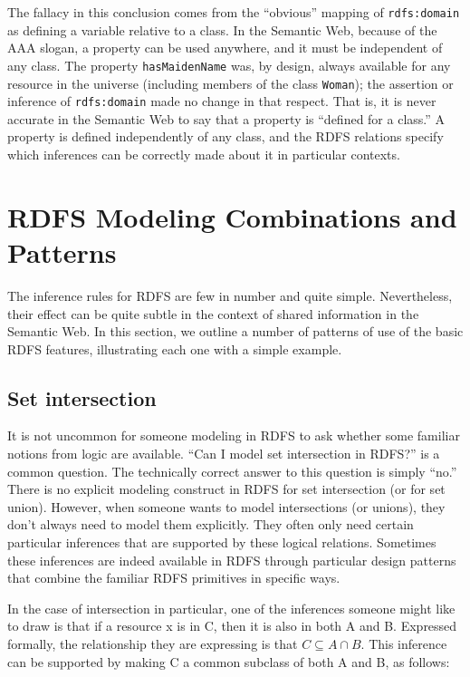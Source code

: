 \begin{sidebar}{}
The fallacy in this conclusion comes from the ``obvious'' mapping of
\texttt{rdfs:domain} as defining a variable relative to a class. In the Semantic
Web, because of the AAA slogan, a property can be used anywhere, and it
must be independent of any class. The property \texttt{hasMaidenName} was, by
design, always available for any resource in the universe (including
members of the class \texttt{Woman}); the assertion or inference of \texttt{rdfs:domain}
made no change in that respect. That is, it is never accurate in the
Semantic Web to say that a property is ``defined for a class.'' A
property is defined independently of any class, and the RDFS relations
specify which inferences can be correctly made about it in particular
contexts.

\end{sidebar}

\section{RDFS Modeling Combinations and Patterns}

The inference rules for RDFS are few in number and quite simple.
Nevertheless, their effect can be quite subtle in the context of shared
information in the Semantic Web. In this section, we outline a number of
patterns of use of the basic RDFS features, illustrating each one with a
simple example.

\subsection{Set intersection}
\label{sintersection}

It is not uncommon for someone modeling in RDFS to ask whether some
familiar notions from logic are available. ``Can I model set
intersection in RDFS?'' is a common question. The technically correct
answer to this question is simply ``no.'' There is no explicit modeling
construct in RDFS for set intersection (or for set union). However, when
someone wants to model intersections (or unions), they don't always need
to model them explicitly. They often only need certain particular
inferences that are
supported by these logical relations. Sometimes these inferences are
indeed available in RDFS through particular design patterns that combine
the familiar RDFS primitives in specific ways.

In the case of intersection in particular, one of the inferences someone
might like to draw is that if a resource x is in C, then it is also in
both A and B. Expressed formally, the relationship they are expressing
is that $C \subseteq A \cap B$. This inference can be supported by making C a common
subclass of both A and B, as follows:

